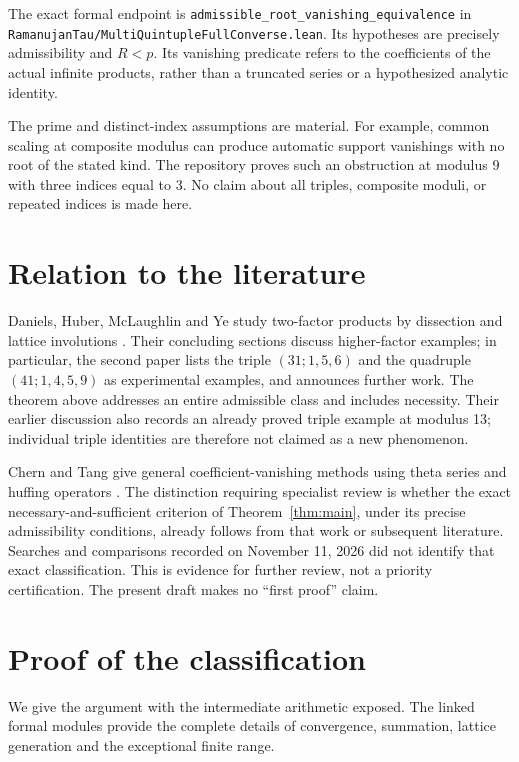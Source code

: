 \documentclass[11pt]{amsart}
\newcommand{\lean}[1]{{\small\nolinkurl{#1}}}
\theoremstyle{definition}
\begin{document}
The exact formal endpoint is
\lean{admissible_root_vanishing_equivalence} in
\lean{RamanujanTau/MultiQuintupleFullConverse.lean}. Its hypotheses are
precisely admissibility and $R<p$. Its vanishing predicate refers to the
coefficients of the actual infinite products, rather than a truncated
series or a hypothesized analytic identity.

The prime and distinct-index assumptions are material. For example,
common scaling at composite modulus can produce automatic support
vanishings with no root of the stated kind. The repository proves such
an obstruction at modulus 9 with three indices equal to 3. No claim about
all triples, composite moduli, or repeated indices is made here.

\section{Relation to the literature}
Daniels, Huber, McLaughlin and Ye study two-factor products by dissection
and lattice involutions \cite{dissection,vanishing}. Their concluding
sections discuss higher-factor examples; in particular, the second paper
lists the triple $(31;1,5,6)$ and the quadruple $(41;1,4,5,9)$ as
experimental examples, and announces further work. The theorem above
addresses an entire admissible class and includes necessity.
Their earlier discussion also records an already proved triple example
at modulus 13; individual triple identities are therefore not claimed
as a new phenomenon.

Chern and Tang give general coefficient-vanishing methods using theta
series and huffing operators \cite{chern-tang}. The distinction requiring
specialist review is whether the exact necessary-and-sufficient criterion
of Theorem~\ref{thm:main}, under its precise admissibility conditions,
already follows from that work or subsequent literature. Searches and
comparisons recorded on November 11, 2026 did not identify that exact
classification. This is evidence for further review, not a priority
certification. The present draft makes no ``first proof'' claim.

\section{Proof of the classification}
We give the argument with the intermediate arithmetic exposed. The
linked formal modules provide the complete details of convergence,
summation, lattice generation and the exceptional finite range.
\end{document}

